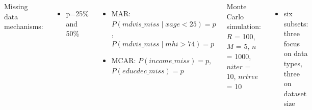 \documentclass[20pt,margin=1in,innermargin=-4.5in,blockverticalspace=-0.25in]{tikzposter}
\begin{document}
\begin{columns}
{        Missing data mechanisms:
        \vspace{-0.5em}
        \begin{itemize}
            \item p=25\% and 50\%
        \end{itemize}
        \vspace{-1.5em}
        \begin{itemize}
            \item MAR: $P(mdvis\_miss \mid xage<25) = p$,  $P(mdvis\_miss \mid mhi>74) = p$ 
            \vspace{-0.5em}
            \item MCAR: $P(income\_miss) = p$, $P(educdec\_miss) = p$
        \end{itemize}
        
        \vspace{-0.5em}
        
        Monte Carlo simulation: $R$ = 100, $M$ = 5, $n$ = 1000, $niter$ = 10, $nrtree$ = 10
        \vspace{-0.5em}
        \begin{itemize}
            \item six subsets: three focus on data types, three on dataset size
        \end{itemize}
        \vspace{-1em}
    }


\end{columns}
\end{document}
